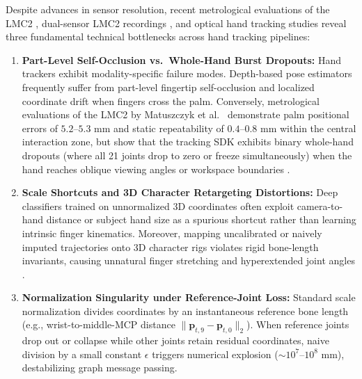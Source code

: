 \documentclass[10pt,twocolumn]{article}
\begin{document}
Despite advances in sensor resolution, recent metrological evaluations of the LMC2 \cite{matuszczyk2025comparative}, dual-sensor LMC2 recordings \cite{gilmartin2024dual}, and optical hand tracking studies \cite{boulahia2017dynamic,kumar2018position,liu2024novel} reveal three fundamental technical bottlenecks across hand tracking pipelines:
\begin{enumerate}
    \item \textbf{Part-Level Self-Occlusion vs.\ Whole-Hand Burst Dropouts:} Hand trackers exhibit modality-specific failure modes. Depth-based pose estimators \cite{desmedt2017shrec,kumar2018position} frequently suffer from part-level fingertip self-occlusion and localized coordinate drift when fingers cross the palm. Conversely, metrological evaluations of the LMC2 by Matuszczyk et al.\ \cite{matuszczyk2025comparative} demonstrate palm positional errors of $5.2\text{--}5.3\text{ mm}$ and static repeatability of $0.4\text{--}0.8\text{ mm}$ within the central interaction zone, but show that the tracking SDK exhibits binary whole-hand dropouts (where all 21 joints drop to zero or freeze simultaneously) when the hand reaches oblique viewing angles or workspace boundaries \cite{boulahia2017dynamic,matuszczyk2025comparative}.
    \item \textbf{Scale Shortcuts and 3D Character Retargeting Distortions:} Deep classifiers trained on unnormalized 3D coordinates often exploit camera-to-hand distance or subject hand size as a spurious shortcut rather than learning intrinsic finger kinematics. Moreover, mapping uncalibrated or naively imputed trajectories onto 3D character rigs violates rigid bone-length invariants, causing unnatural finger stretching and hyperextended joint angles \cite{noiumkar2013use}.
    \item \textbf{Normalization Singularity under Reference-Joint Loss:} Standard scale normalization divides coordinates by an instantaneous reference bone length (e.g., wrist-to-middle-MCP distance $\|\mathbf{p}_{t,9}-\mathbf{p}_{t,0}\|_2$). When reference joints drop out or collapse while other joints retain residual coordinates, naive division by a small constant $\epsilon$ triggers numerical explosion ($\sim 10^7\text{--}10^8\text{ mm}$), destabilizing graph message passing.
\end{enumerate}
\end{document}
